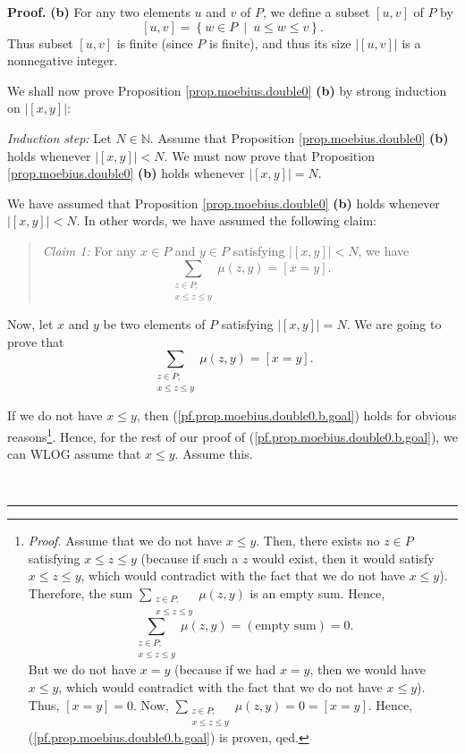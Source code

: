 \documentclass[numbers=enddot,12pt,final,onecolumn,notitlepage]{scrartcl}%
\theoremstyle{definition}
\newenvironment{statement}{\begin{quote}}{\end{quote}}
\newenvironment{proof}[1][Proof]{\noindent\textbf{#1.} }{\ \rule{0.5em}{0.5em}}
\newenvironment{verlong}{}{}
\let\sumnonlimits\sum
\renewcommand{\sum}{\sumnonlimits\limits}
\begin{document}
\begin{verlong}
\begin{proof}
\textbf{(b)} For any two elements $u$ and $v$ of $P$, we define a subset
$\left[  u,v\right]  $ of $P$ by%
\[
\left[  u,v\right]  =\left\{  w\in P\ \mid\ u\leq w\leq v\right\}  .
\]
Thus subset $\left[  u,v\right]  $ is finite (since $P$ is finite), and thus
its size $\left\vert \left[  u,v\right]  \right\vert $ is a nonnegative integer.

We shall now prove Proposition \ref{prop.moebius.double0} \textbf{(b)} by
strong induction on $\left\vert \left[  x,y\right]  \right\vert $:

\textit{Induction step:} Let $N\in\mathbb{N}$. Assume that Proposition
\ref{prop.moebius.double0} \textbf{(b)} holds whenever $\left\vert \left[
x,y\right]  \right\vert <N$. We must now prove that Proposition
\ref{prop.moebius.double0} \textbf{(b)} holds whenever $\left\vert \left[
x,y\right]  \right\vert =N$.

We have assumed that Proposition \ref{prop.moebius.double0} \textbf{(b)} holds
whenever $\left\vert \left[  x,y\right]  \right\vert <N$. In other words, we
have assumed the following claim:

\begin{statement}
\textit{Claim 1:} For any $x\in P$ and $y\in P$ satisfying $\left\vert \left[
x,y\right]  \right\vert <N$, we have%
\[
\sum_{\substack{z\in P;\\x\leq z\leq y}}\mu\left(  z,y\right)  =\left[
x=y\right]  .
\]

\end{statement}

Now, let $x$ and $y$ be two elements of $P$ satisfying $\left\vert \left[
x,y\right]  \right\vert =N$. We are going to prove that%
\begin{equation}
\sum_{\substack{z\in P;\\x\leq z\leq y}}\mu\left(  z,y\right)  =\left[
x=y\right]  . \label{pf.prop.moebius.double0.b.goal}%
\end{equation}


If we do not have $x\leq y$, then (\ref{pf.prop.moebius.double0.b.goal}) holds
for obvious reasons\footnote{\textit{Proof.} Assume that we do not have $x\leq
y$. Then, there exists no $z\in P$ satisfying $x\leq z\leq y$ (because if such
a $z$ would exist, then it would satisfy $x\leq z\leq y$, which would
contradict with the fact that we do not have $x\leq y$). Therefore, the sum
$\sum_{\substack{z\in P;\\x\leq z\leq y}}\mu\left(  z,y\right)  $ is an empty
sum. Hence,%
\[
\sum_{\substack{z\in P;\\x\leq z\leq y}}\mu\left(  z,y\right)  =\left(
\text{empty sum}\right)  =0.
\]
But we do not have $x=y$ (because if we had $x=y$, then we would have $x\leq
y$, which would contradict with the fact that we do not have $x\leq y$). Thus,
$\left[  x=y\right]  =0$. Now, $\sum_{\substack{z\in P;\\x\leq z\leq y}%
}\mu\left(  z,y\right)  =0=\left[  x=y\right]  $. Hence,
(\ref{pf.prop.moebius.double0.b.goal}) is proven, qed.}. Hence, for the rest
of our proof of (\ref{pf.prop.moebius.double0.b.goal}), we can WLOG assume
that $x\leq y$. Assume this.


\end{proof}
\end{verlong}
\end{document}
